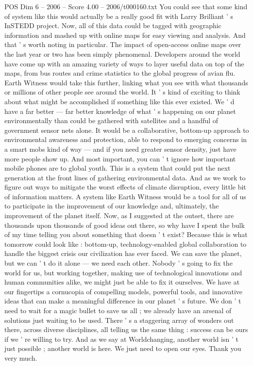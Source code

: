 \begin{textsample}{POS Dim 6 – 2006 – Score 4.00 – 2006/t000160.txt}
You could see that some kind of system like this would actually be a really good fit with Larry Brilliant ' s InSTEDD project.
Now, all of this data could be tagged with geographic information and mashed up with online maps for easy viewing and analysis.
And that ' s worth noting in particular.
The impact of open-access online maps over the last year or two has been simply phenomenal.
Developers around the world have come up with an amazing variety of ways to layer useful data on top of the maps, from bus routes and crime statistics to the global progress of avian flu.
Earth Witness would take this further, linking what you see with what thousands or millions of other people see around the world.
It ' s kind of exciting to think about what might be accomplished if something like this ever existed.
We ' d have a far better — far better knowledge of what ' s happening on our planet environmentally than could be gathered with satellites and a handful of government sensor nets alone.
It would be a collaborative, bottom-up approach to environmental awareness and protection, able to respond to emerging concerns in a smart mobs kind of way — and if you need greater sensor density, just have more people show up.
And most important, you can ' t ignore how important mobile phones are to global youth.
This is a system that could put the next generation at the front lines of gathering environmental data.
And as we work to figure out ways to mitigate the worst effects of climate disruption, every little bit of information matters.
A system like Earth Witness would be a tool for all of us to participate in the improvement of our knowledge and, ultimately, the improvement of the planet itself.
Now, as I suggested at the outset, there are thousands upon thousands of good ideas out there, so why have I spent the bulk of my time telling you about something that doesn ' t exist?
Because this is what tomorrow could look like : bottom-up, technology-enabled global collaboration to handle the biggest crisis our civilization has ever faced.
We can save the planet, but we can ' t do it alone — we need each other.
Nobody ' s going to fix the world for us, but working together, making use of technological innovations and human communities alike, we might just be able to fix it ourselves.
We have at our fingertips a cornucopia of compelling models, powerful tools, and innovative ideas that can make a meaningful difference in our planet ' s future.
We don ' t need to wait for a magic bullet to save us all ; we already have an arsenal of solutions just waiting to be used.
There ' s a staggering array of wonders out there, across diverse disciplines, all telling us the same thing : success can be ours if we ' re willing to try.
And as we say at Worldchanging, another world isn ' t just possible ; another world is here.
We just need to open our eyes.
Thank you very much.

\end{textsample}
